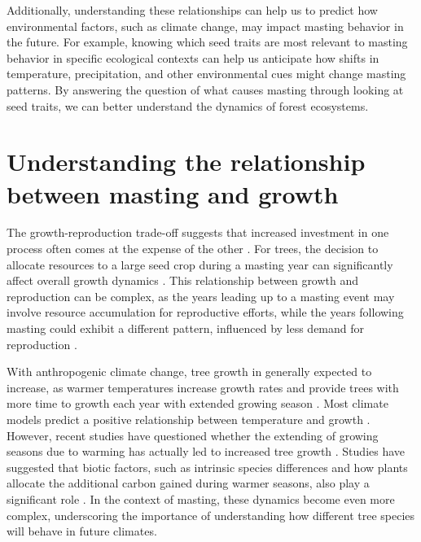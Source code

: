 \documentclass[11pt,letter]{article}
\begin{document}
Additionally, understanding these relationships can help us to predict how environmental factors, such as climate change, may impact masting behavior in the future. For example, knowing which seed traits are most relevant to masting behavior in specific ecological contexts can help us anticipate how shifts in temperature, precipitation, and other environmental cues might change masting patterns. By answering the question of what causes masting through looking at seed traits, we can better understand the dynamics of forest ecosystems.\par

\section{Understanding the relationship between masting and growth}
The growth-reproduction trade-off suggests that increased investment in one process often comes at the expense of the other \citep{grime1977evidence, stearns1998evolution}. For trees, the decision to allocate resources to a large seed crop during a masting year can significantly affect overall growth dynamics \citep{hacket2016tree}. This relationship between growth and reproduction can be complex, as the years leading up to a masting event may involve resource accumulation for reproductive efforts, while the years following masting could exhibit a different pattern, influenced by less demand for reproduction \citep{kelly1994evolutionary}.\par

With anthropogenic climate change, tree growth in generally expected to increase, as warmer temperatures increase growth rates and provide trees with more time to growth each year with extended growing season \citep{keenan2014net, finzi2020carbon}. Most climate models predict a positive relationship between temperature and growth \citep{friedlingstein2022global, ito2020global}. However, recent studies have questioned whether the extending of growing seasons due to warming has actually led to increased tree growth \citep{dow2022warm, green2022limits}. Studies have suggested that biotic factors, such as intrinsic species differences and how plants allocate the additional carbon gained during warmer seasons, also play a significant role \citep{hacket2016consistent}. In the context of masting,  these dynamics become even more complex, underscoring the importance of understanding how different tree species will behave in future climates.\par
\end{document}
